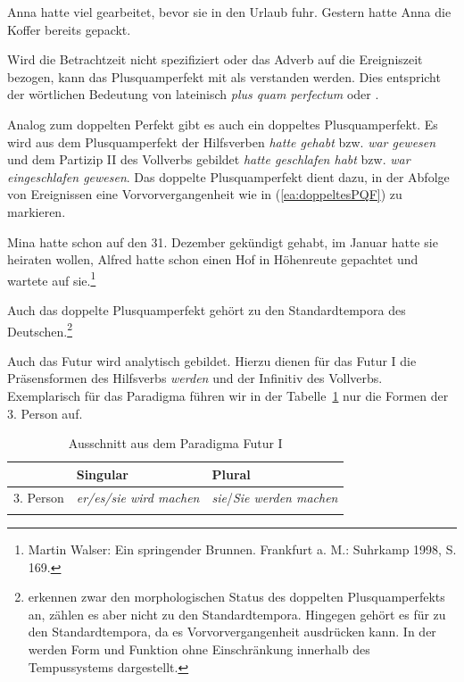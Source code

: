 \ea \label{ea:PQF}
\ea \label{ea:PQF_B_E} Anna hatte viel gearbeitet, bevor sie in den Urlaub fuhr.
\ex \label{ex:PQF_B_Adv} Gestern hatte Anna die Koffer bereits gepackt.
\z 
\z 

Wird die Betrachtzeit nicht spezifiziert oder das Adverb auf die Ereigniszeit bezogen, kann das Plusquamperfekt mit \citet[351]{Welke2005Temp} als  verstanden werden. Dies entspricht der wörtlichen Bedeutung von lateinisch \textit{plus quam perfectum}  oder .

Analog zum doppelten Perfekt gibt es auch ein doppeltes Plusquamperfekt. Es wird aus dem Plusquamperfekt der Hilfsverben \textit{hatte gehabt} bzw. \textit{war gewesen} und dem Partizip II des Vollverbs gebildet \textit{hatte geschlafen habt} bzw. \textit{war eingeschlafen gewesen}. Das doppelte Plusquamperfekt dient dazu, in der Abfolge von Ereignissen eine Vorvorvergangenheit wie in (\ref{ea:doppeltesPQF}) zu markieren.

\ea \label{ea:doppeltesPQF} Mina hatte schon auf den 31. Dezember gekündigt gehabt, im Januar hatte sie heiraten wollen, Alfred hatte schon einen Hof in Höhenreute gepachtet und wartete auf sie.\footnote{Martin Walser: Ein springender Brunnen. Frankfurt a. M.: Suhrkamp 1998, S. 169.}
\z 

Auch das doppelte Plusquamperfekt gehört zu den Standardtempora des Deutschen.\footnote{\citet[172]{LitvinovRadcenko1998} erkennen zwar den morphologischen Status des doppelten Plusquamperfekts an, zählen es aber nicht zu den Standardtempora. Hingegen gehört es für \citet[79]{BreuerDorow1996} zu den Standardtempora, da es Vorvorvergangenheit  ausdrücken kann. In der \citet[220, §327]{Duden2022} werden Form und Funktion ohne Einschränkung innerhalb des Tempussystems dargestellt.}


\label{subsubsubsection:FuturI}


Auch das Futur wird analytisch gebildet. Hierzu dienen für das Futur I die Präsensformen des Hilfsverbs \textit{werden} und der Infinitiv des Vollverbs. Exemplarisch für das Paradigma führen wir in der Tabelle~\ref{tab:FuturI} nur die Formen der 3. Person auf.

\begin{table}
  \centering
  \begin{tabular}{l l l}
    \lsptoprule
    & Singular & Plural \\
    \hline
    3. Person & \textit{er/es/sie wird machen} & \textit{sie}/\textit{Sie werden machen} \\
    \lspbottomrule 
  \end{tabular}
  \caption{Ausschnitt aus dem Paradigma Futur I}
  \label{tab:FuturI}
\end{table}



